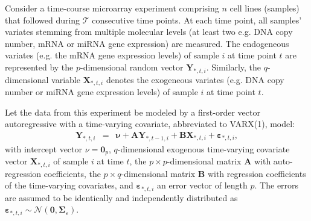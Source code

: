 {Consider a time-course microarray experiment comprising $n$ cell lines (samples) that followed during $\mathcal{T}$ consecutive time points. At each time point, all samples' variates stemming from multiple molecular levels (at least two e.g. DNA copy number, mRNA or miRNA gene expression) are measured. The endogeneous variates (e.g. the mRNA gene expression levels) of sample $i$ at time point $t$ are represented by the $p$-dimensional random vector $\mathbf{Y}_{*,t,i}$. Similarly, the $q$-dimensional variable $\mathbf{X}_{*,t,i}$ denotes the exogeneous variates (e.g. DNA copy number or miRNA gene expression levels) of sample $i$ at time point $t$.


Let the data from this experiment be modeled by a first-order vector autoregressive with a time-varying covariate, abbreviated to VARX(1), model:
\begin{eqnarray*}
\mathbf{Y}_{*,t,i} & = & \boldsymbol{\nu}+\mathbf{A} \mathbf{Y}_{*,t-1,i} + \mathbf{B} \mathbf{X}_{*,t,i} + \boldsymbol{\varepsilon}_{*,t,i},
\end{eqnarray*}
with intercept vector $\nu=\mathbf{0}_{p}$, $q$-dimensional exogenous time-varying covariate vector $\mathbf{X}_{*,t,i}$ of sample $i$ at time $t$, the $p \times p$-dimensional matrix $\mathbf{A}$ with auto-regression coefficients, the $p \times q$-dimensional matrix $\mathbf{B}$ with regression coefficients of the time-varying covariates, and $\boldsymbol{\varepsilon}_{*,t,i}$ an error vector of length $p$. The errors are assumed to be identically and independently distributed as $\boldsymbol{\varepsilon}_{*,t,i} \sim \mathcal{N}( \mathbf{0}, \mathbf{\Sigma}_{\varepsilon})$.

}
